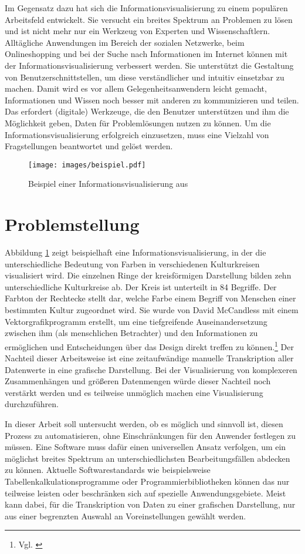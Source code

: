 \documentclass[a4paper, 
               12pt,
               DIV=calc,
               version=first,
               pdftex,
               headsepline,
               footsepline,
               bibtotocnumbered,
               liststotocnumbered]{scrreprt}
\begin{document}
Im Gegensatz dazu hat sich die Informationsvisualisierung zu einem populären Arbeitsfeld entwickelt. Sie versucht ein breites
Spektrum an Problemen zu lösen und ist nicht mehr nur ein Werkzeug von Experten und Wissenschaftlern.
Alltägliche Anwendungen
im Bereich der sozialen Netzwerke, beim Onlineshopping und bei der Suche nach Informationen
im Internet können mit der Informationsvisualisierung verbessert
werden. Sie unterstützt die Gestaltung von Benutzerschnittstellen, um diese verständlicher und intuitiv einsetzbar zu machen.
Damit wird es vor allem Gelegenheitsanwendern leicht gemacht, Informationen und
Wissen noch besser mit anderen zu kommunizieren und teilen. Das erfordert (digitale) Werkzeuge,
die den Benutzer unterstützen und ihm die Möglichkeit geben, Daten für Problemlösungen nutzen zu können.
Um die Informationsvisualisierung erfolgreich einzusetzen, muss eine Vielzahl von Fragstellungen
beantwortet und gelöst werden.
\begin{figure}
\centering
\texttt{[image: images/beispiel.pdf]}
\caption{Beispiel einer Informationsvisualisierung aus \citep[S.\,76]{McCandless}}
\label{fig:beispiel}
\end{figure}
\section{Problemstellung}
Abbildung \ref{fig:beispiel} zeigt beispielhaft eine Informationsvisualisierung, in der die
unterschiedliche Bedeutung von Farben in verschiedenen
Kulturkreisen visualisiert wird. Die einzelnen Ringe der kreisförmigen Darstellung bilden zehn
unterschiedliche Kulturkreise ab. Der Kreis ist unterteilt in 84 Begriffe.
Der Farbton der Rechtecke stellt dar, welche Farbe einem Begriff von Menschen einer bestimmten Kultur zugeordnet wird.
Sie wurde von David McCandless mit einem Vektorgrafikprogramm erstellt, um
eine tiefgreifende Auseinandersetzung zwischen ihm (als menschlichen Betrachter) und den Informationen
zu ermöglichen und Entscheidungen über das Design direkt treffen zu können.\footnote{Vgl. \citep{infoblog}} Der Nachteil dieser
Arbeitsweise ist eine zeitaufwändige manuelle Transkription aller Datenwerte in eine grafische
Darstellung. Bei der Visualisierung von komplexeren Zusammenhängen und größeren Datenmengen würde dieser 
Nachteil noch verstärkt werden und es teilweise unmöglich machen eine Visualisierung durchzuführen.

In dieser Arbeit soll untersucht werden, ob es möglich und sinnvoll ist, diesen Prozess  zu automatisieren,
ohne Einschränkungen für den Anwender festlegen zu müssen.
Eine Software muss dafür einen universellen Ansatz verfolgen, um ein möglichst breites Spektrum an
unterschiedlichsten Bearbeitungsfällen abdecken zu können. 
Aktuelle Softwarestandards wie beispielsweise Tabellenkalkulationsprogramme oder Programmierbibliotheken
können das nur teilweise leisten oder beschränken sich auf spezielle Anwendungsgebiete.
Meist kann dabei, für die Transkription von Daten zu einer grafischen Darstellung, nur
aus einer begrenzten Auswahl an Voreinstellungen gewählt werden.
\end{document}
